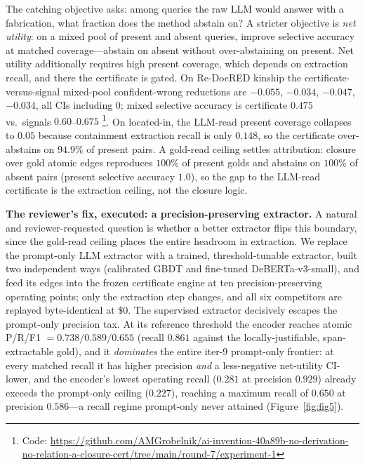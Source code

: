 \documentclass[11pt,letterpaper]{article}
\begin{document}
The catching objective asks: among queries the raw LLM would answer with a fabrication, what fraction does the method abstain on? A stricter objective is \emph{net utility}: on a mixed pool of present and absent queries, improve selective accuracy at matched coverage---abstain on absent without over-abstaining on present. Net utility additionally requires high present coverage, which depends on extraction recall, and there the certificate is gated. On Re-DocRED kinship the certificate-versus-signal mixed-pool confident-wrong reductions are $-0.055$, $-0.034$, $-0.047$, $-0.034$, all CIs including $0$; mixed selective accuracy is certificate $0.475$ vs.\ signals $0.60$--$0.675$ \footnote{Code: \url{https://github.com/AMGrobelnik/ai-invention-40a89b-no-derivation-no-relation-a-closure-cert/tree/main/round-7/experiment-1}}. On located-in, the LLM-read present coverage collapses to $0.05$ because containment extraction recall is only $0.148$, so the certificate over-abstains on $94.9\%$ of present pairs. A gold-read ceiling settles attribution: closure over gold atomic edges reproduces $100\%$ of present golds and abstains on $100\%$ of absent pairs (present selective accuracy $1.0$), so the gap to the LLM-read certificate is the extraction ceiling, not the closure logic.

\textbf{The reviewer's fix, executed: a precision-preserving extractor.} A natural and reviewer-requested question is whether a better extractor flips this boundary, since the gold-read ceiling places the entire headroom in extraction. We replace the prompt-only LLM extractor with a trained, threshold-tunable extractor, built two independent ways (calibrated GBDT and fine-tuned DeBERTa-v3-small), and feed its edges into the frozen certificate engine at ten precision-preserving operating points; only the extraction step changes, and all six competitors are replayed byte-identical at $\$0$. The supervised extractor decisively escapes the prompt-only precision tax. At its reference threshold the encoder reaches atomic P/R/F1 $=0.738/0.589/0.655$ (recall $0.861$ against the locally-justifiable, span-extractable gold), and it \emph{dominates} the entire iter-9 prompt-only frontier: at every matched recall it has higher precision \emph{and} a less-negative net-utility CI-lower, and the encoder's lowest operating recall ($0.281$ at precision $0.929$) already exceeds the prompt-only ceiling ($0.227$), reaching a maximum recall of $0.650$ at precision $0.586$---a recall regime prompt-only never attained (Figure~\ref{fig:fig5}).
\end{document}
